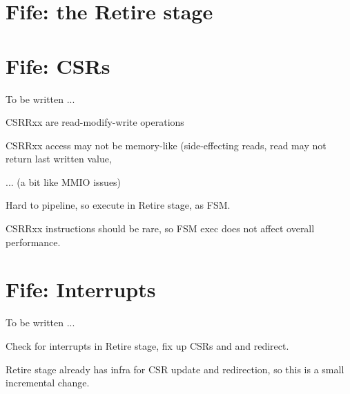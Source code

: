 
\section{Fife: the Retire stage}

\label{Sec_Fife_Retire_stage}


\section{Fife: CSRs}

To be written ...

\begin{tightlist}
\item CSRRxx are read-modify-write operations
\item CSRRxx access may not be memory-like (side-effecting reads, read
      may not return last written value,
\item ... (a bit like MMIO issues)
\end{tightlist}
Hard to pipeline, so execute in Retire stage, as FSM.

CSRRxx instructions should be rare, so FSM exec does not affect overall performance.


\section{Fife: Interrupts}

To be written ...

Check for interrupts in Retire stage, fix up CSRs and and redirect.

Retire stage already has infra for CSR update and redirection, so this
is a small incremental change.

